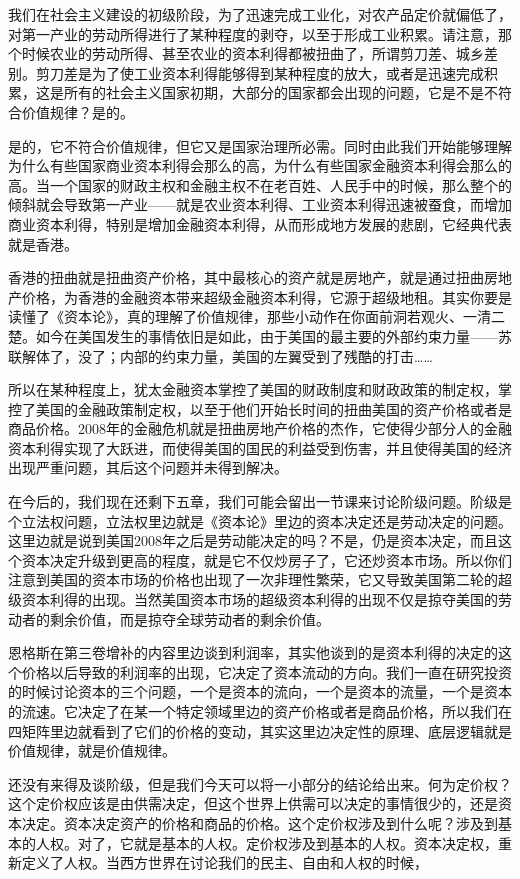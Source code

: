 \documentclass[UTF8, 12pt, a4paper]{ctexrep}
\begin{document}
我们在社会主义建设的初级阶段，为了迅速完成工业化，对农产品定价就偏低了，对第一产业的劳动所得进行了某种程度的剥夺，以至于形成工业积累。请注意，那个时候农业的劳动所得、甚至农业的资本利得都被扭曲了，所谓剪刀差、城乡差别。剪刀差是为了使工业资本利得能够得到某种程度的放大，或者是迅速完成积累，这是所有的社会主义国家初期，大部分的国家都会出现的问题，它是不是不符合价值规律？是的。

是的，它不符合价值规律，但它又是国家治理所必需。同时由此我们开始能够理解为什么有些国家商业资本利得会那么的高，为什么有些国家金融资本利得会那么的高。当一个国家的财政主权和金融主权不在老百姓、人民手中的时候，那么整个的倾斜就会导致第一产业——就是农业资本利得、工业资本利得迅速被蚕食，而增加商业资本利得，特别是增加金融资本利得，从而形成地方发展的悲剧，它经典代表就是香港。

香港的扭曲就是扭曲资产价格，其中最核心的资产就是房地产，就是通过扭曲房地产价格，为香港的金融资本带来超级金融资本利得，它源于超级地租。其实你要是读懂了《资本论》，真的理解了价值规律，那些小动作在你面前洞若观火、一清二楚。如今在美国发生的事情依旧是如此，由于美国的最主要的外部约束力量——苏联解体了，没了；内部的约束力量，美国的左翼受到了残酷的打击……

所以在某种程度上，犹太金融资本掌控了美国的财政制度和财政政策的制定权，掌控了美国的金融政策制定权，以至于他们开始长时间的扭曲美国的资产价格或者是商品价格。2008年的金融危机就是扭曲房地产价格的杰作，它使得少部分人的金融资本利得实现了大跃进，而使得美国的国民的利益受到伤害，并且使得美国的经济出现严重问题，其后这个问题并未得到解决。

在今后的，我们现在还剩下五章，我们可能会留出一节课来讨论阶级问题。阶级是个立法权问题，立法权里边就是《资本论》里边的资本决定还是劳动决定的问题。这里边就是说到美国2008年之后是劳动能决定的吗？不是，仍是资本决定，而且这个资本决定升级到更高的程度，就是它不仅炒房子了，它还炒资本市场。所以你们注意到美国的资本市场的价格也出现了一次非理性繁荣，它又导致美国第二轮的超级资本利得的出现。当然美国资本市场的超级资本利得的出现不仅是掠夺美国的劳动者的剩余价值，而是掠夺全球劳动者的剩余价值。

恩格斯在第三卷增补的内容里边谈到利润率，其实他谈到的是资本利得的决定的这个价格以后导致的利润率的出现，它决定了资本流动的方向。我们一直在研究投资的时候讨论资本的三个问题，一个是资本的流向，一个是资本的流量，一个是资本的流速。它决定了在某一个特定领域里边的资产价格或者是商品价格，所以我们在四矩阵里边就看到了它们的价格的变动，其实这里边决定性的原理、底层逻辑就是价值规律，就是价值规律。

还没有来得及谈阶级，但是我们今天可以将一小部分的结论给出来。何为定价权？这个定价权应该是由供需决定，但这个世界上供需可以决定的事情很少的，还是资本决定。资本决定资产的价格和商品的价格。这个定价权涉及到什么呢？涉及到基本的人权。对了，它就是基本的人权。定价权涉及到基本的人权。资本决定权，重新定义了人权。当西方世界在讨论我们的民主、自由和人权的时候，
\end{document}
